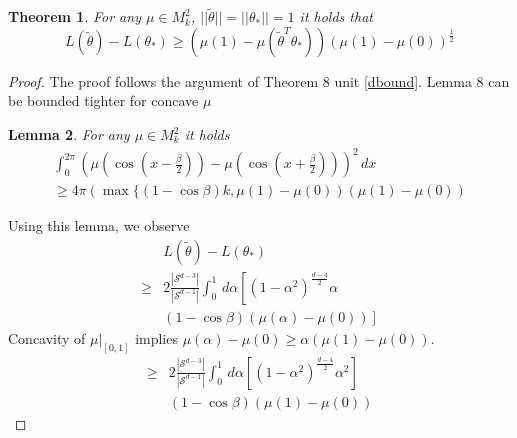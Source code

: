 \documentclass[twoside]{article} \usepackage{aistats2017}
\newtheorem{theorem}{Theorem}
\newtheorem{lemma}[theorem]{Lemma}
\begin{document}
\begin{theorem}
For any $\mu \in M_k^2$, $||\tilde{\theta}||=||\theta_*||=1$ it holds that
$$L(\tilde{\theta})-L(\theta_*) \geq (\mu(1)-\mu(\tilde{\theta}^T\theta_*) )(\mu(1)-\mu(0))^{\frac{1}{2}}$$
\end{theorem}
\begin{proof}
The proof follows the argument of Theorem 8 unit \ref{dbound}. Lemma 8 can be bounded tighter for concave $\mu$
\begin{lemma}\label{concavebound}
    For any $\mu\in M_k^2$ it holds
\begin{align*}
            \int_{0}^{2\pi}\left(\mu(\cos(x-\frac{\beta}{2}))-\mu( \cos(x+\frac{\beta}{2}))\right)^2\, dx\\
            \geq 4\pi(\max\{(1-\cos{\beta})k,\mu(1)-\mu(0))(\mu(1)-\mu(0))
\end{align*}
\end{lemma}
Using this lemma, we observe
\begin{align*}
    &L(\tilde{\theta})-L(\theta_*)\\
    \geq&2\frac{|\mathcal{S}^{d-3}|}{|\mathcal{S}^{d-1}|}\int_{0}^{1}\,d\alpha\left[(1-\alpha^2)^{\frac{d-4}{2}}\alpha\right.\\
    &\left.(1-\cos{\beta})(\mu(\alpha)-\mu(0))\right]
\end{align*}
Concavity of $\mu|_{[0,1]}$ implies $\mu(\alpha)-\mu(0)\geq \alpha(\mu(1)-\mu(0))$.
\begin{align*}
    \geq&2\frac{|\mathcal{S}^{d-3}|}{|\mathcal{S}^{d-1}|}\int_{0}^{1}\,d\alpha\left[(1-\alpha^2)^{\frac{d-4}{2}}\alpha^{2}\right]\\
    &(1-\cos{\beta})(\mu(1)-\mu(0))
\end{align*}
\end{proof}
\end{document}
